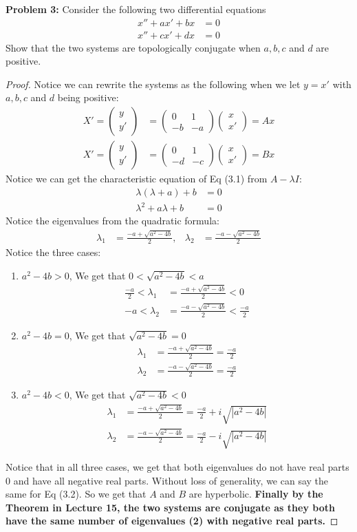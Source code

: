 \documentclass[11pt]{article}
\newcommand{\cvec}[2]{\begin{pmatrix} #1 \\ #2 \end{pmatrix}}
\newcommand{\smat}[4]{\begin{pmatrix} #1 & #2 \\ #3 & #4 \end{pmatrix}}
\newcommand{\skipline}{\vspace{\baselineskip}}
\newenvironment{problem}[1]{\textbf{Problem #1: }}{\newpage}
\begin{document}
	\begin{problem}{3}
		Consider the following two differential equations
		\begin{align*}
			x'' + ax' + bx &= 0 \\
			x'' + cx' + dx &= 0
		\end{align*}
		Show that the two systems are topologically conjugate when $a, b, c$ and $d$ are positive.
		\begin{proof}
			Notice we can rewrite the systems as the following when we let $y = x'$ with $a, b, c$ and $d$ being positive:
			\begin{align*}
				X' = \cvec{y}{y'} &= \smat{0}{1}{-b}{-a}\cvec{x}{x'} = Ax \tag{3.1} \\
				X' = \cvec{y}{y'} &= \smat{0}{1}{-d}{-c}\cvec{x}{x'} = Bx \tag{3.2}
			\end{align*}
			Notice we can get the characteristic equation of Eq (3.1) from $A - \lambda I$:
			\begin{align*}
				\lambda(\lambda + a) + b &= 0 \\
				\lambda^2 + a\lambda + b &= 0
			\end{align*} 
			Notice the eigenvalues from the quadratic formula:
			\begin{align*}
				\lambda_1 &= \frac{-a + \sqrt{a^2 - 4b}}{2}, &
				\lambda_2 &= \frac{-a - \sqrt{a^2 - 4b}}{2}
			\end{align*}
			Notice the three cases:
			\begin{enumerate}[label = (\arabic*)]
				\item $a^2 - 4b > 0$, We get that $0 < \sqrt{a^2 - 4b} < a$
				\begin{align*}
					\frac{-a}{2} < \lambda_1 &= \frac{-a + \sqrt{a^2 - 4b}}{2} < 0 \\
					-a < \lambda_2 &= \frac{-a - \sqrt{a^2 - 4b}}{2} < \frac{-a}{2}
				\end{align*}
				\item $a^2 - 4b = 0$, We get that $\sqrt{a^2 - 4b} = 0$
				\begin{align*}
				\lambda_1 &= \frac{-a + \sqrt{a^2 - 4b}}{2} = \frac{-a}{2} \\
				\lambda_2 &= \frac{-a - \sqrt{a^2 - 4b}}{2} = \frac{-a}{2}
				\end{align*}
				\item $a^2 - 4b < 0$, We get that $\sqrt{a^2 - 4b} < 0$
				\begin{align*}
					\lambda_1 &= \frac{-a + \sqrt{a^2 - 4b}}{2} = \frac{-a}{2} + i\sqrt{|a^2 - 4b|} \\
					\lambda_2 &= \frac{-a - \sqrt{a^2 - 4b}}{2} = \frac{-a}{2} - i\sqrt{|a^2 - 4b|}
				\end{align*}
			\end{enumerate}
			\skipline 
			Notice that in all three cases, we get that both eigenvalues do not have real parts 0 and have all negative real parts.  Without loss of generality, we can say the same for Eq (3.2).  So we get that $A$ and $B$ are hyperbolic. \textbf{Finally by the Theorem in Lecture 15, the two systems are conjugate as they both have the same number of eigenvalues (2) with negative real parts. }
		\end{proof}
	\end{problem}
\end{document}
